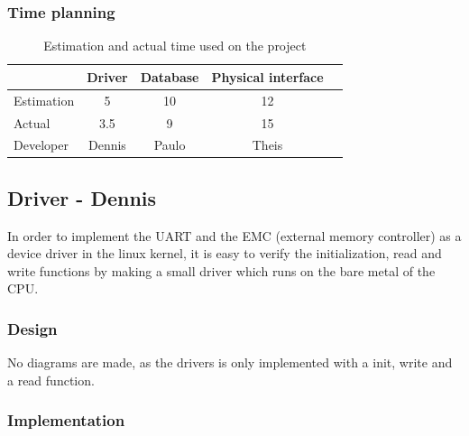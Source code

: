 \subsubsection{Time planning}
\begin{table}[H]
\centering
	\begin{tabular}{|l|c|c|c|c|}
		\hline
		~			& Driver		& Database	& Physical interface\\ \hline
		Estimation	& 5			& 10			& 12					\\
		Actual		& 3.5			& 9			& 15				\\
		Developer	& Dennis		& Paulo		& Theis			\\
		\hline
	\end{tabular}
	\caption{Estimation and actual time used on the project}
\end{table}
\subsection{Driver - Dennis}
In order to implement the UART and the EMC (external memory controller) as a device driver in the linux kernel, it is easy to verify the initialization, read and write functions by making a small driver which runs on the bare metal of the CPU. 
%	
\subsubsection{Design}
No diagrams are made, as the drivers is only implemented with a init, write and a read function. 

\subsubsection{Implementation}


